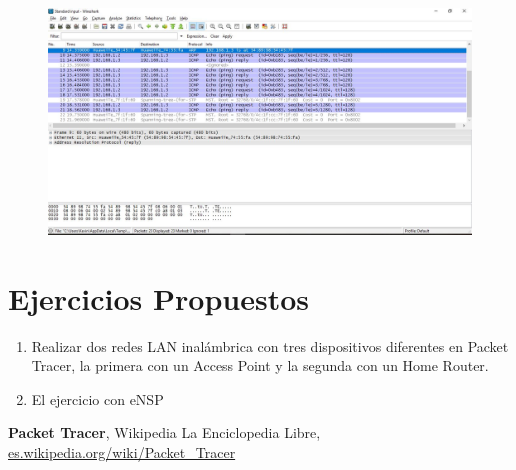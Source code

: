 \documentclass[journal]{IEEEtran}
\begin{document}
\begin{center}
\begin{figure}[H]
\centering
\includegraphics[scale=0.25]{13.JPG} 
\end{figure}
\end{center}
\section{Ejercicios Propuestos}
\begin{enumerate}
	\item Realizar dos redes LAN inalámbrica con tres dispositivos diferentes en Packet Tracer, la primera con un Access Point y la segunda con un Home Router.
	\item El ejercicio con eNSP
\end{enumerate}

\begin{thebibliography}{3}
	 \textbf{Packet Tracer}, Wikipedia La Enciclopedia Libre, \url{es.wikipedia.org/wiki/Packet_Tracer}
\end{thebibliography}
\end{document}
